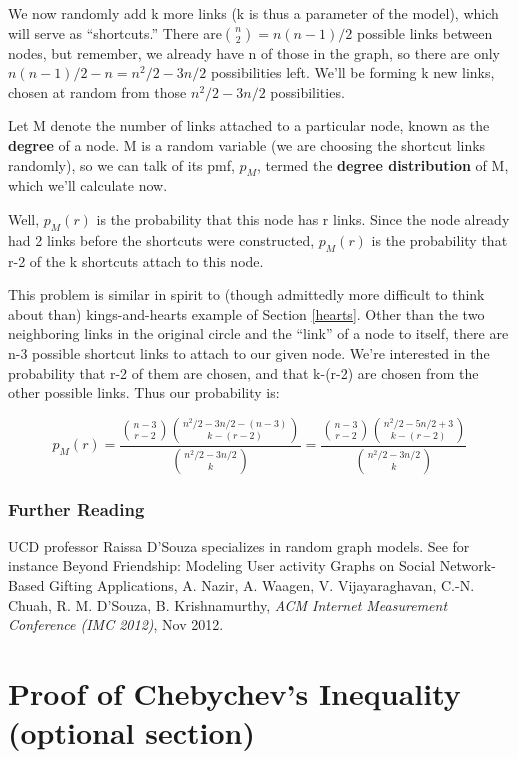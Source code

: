 We now randomly add k more links (k is thus a parameter of the model),
which will serve as ``shortcuts.''  There are$\binom{n}{2} = n(n-1)/2$
possible links between nodes, but remember, we already have n of those
in the graph, so there are only $n(n-1)/2 - n = n^2/2 - 3n/2$
possibilities left.  We'll be forming k new links, chosen at random from
those $n^2/2 - 3n/2$ possibilities.

Let M denote the number of links attached to a particular node, known
as the {\bf degree} of a node.  M is a random variable (we are choosing
the shortcut links randomly), so we can talk of its pmf, $p_M$, termed
the {\bf degree distribution} of M, which we'll calculate now.

Well, $p_M(r)$ is the probability that this node has r links.  Since the
node already had 2 links before the shortcuts were constructed, $p_M(r)$
is the probability that r-2 of the k shortcuts attach to this node.

This problem is similar in spirit to (though admittedly more difficult
to think about than) kings-and-hearts example of Section \ref{hearts}.
Other than the two neighboring links in the original circle and the
``link'' of a node to itself, there are n-3 possible shortcut links to
attach to our given node.  We're interested in the probability that r-2
of them are chosen, and that k-(r-2) are chosen from the other possible
links.  Thus our probability is:

\begin{equation}
p_M(r) =
\frac
{\binom{n-3}{r-2}
\binom{n^2/2-3n/2-(n-3)}{k-(r-2)}}
{\binom{n^2/2-3n/2}{k}} =
\frac
{\binom{n-3}{r-2}
\binom{n^2/2-5n/2+3}{k-(r-2)}}
{\binom{n^2/2-3n/2}{k}} 
\end{equation}

\subsubsection{Further Reading}

UCD professor Raissa D'Souza specializes in random graph models.  See
for instance Beyond Friendship: Modeling User activity Graphs on Social
Network-Based Gifting Applications, A. Nazir, A. Waagen, V.
Vijayaraghavan, C.-N. Chuah, R. M.  D'Souza, B. Krishnamurthy, {\it ACM
Internet Measurement Conference (IMC 2012)}, Nov 2012. 

\section{Proof of Chebychev's Inequality (optional section)}
\label{chebproof}


